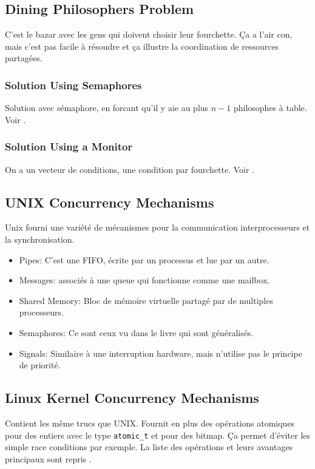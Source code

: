 \subsection{Dining Philosophers Problem}
C'est le bazar avec les gens qui doivent choisir leur fourchette.
Ça a l'air con, mais c'est pas facile à résoudre et ça illustre la coordination de ressources partagées.

\subsubsection{Solution Using Semaphores}
Solution avec sémaphore, en forcant qu'il y aie au plus $n-1$ philosophes à table.
Voir \cite[p.~281]{stallings}.

\subsubsection{Solution Using a Monitor}
On a un vecteur de conditions, une condition par fourchette.
Voir \cite[p.~282]{stallings}.

\subsection{UNIX Concurrency Mechanisms}
Unix fourni une variété de mécanismes pour la communication interprocesseurs et la synchronisation.
\begin{itemize}
  \item Pipes: C'est une FIFO, écrite par un processus et lue par un autre.
  \item Messages: associés à une queue qui fonctionne comme une mailbox.
  \item Shared Memory: Bloc de mémoire virtuelle partagé par de multiples processeurs.
  \item Semaphores: Ce sont ceux vu dans le livre qui sont généralisés.
  \item Signals: Similaire à une interruption hardware, mais n'utilise pas le principe de priorité.
\end{itemize}

\subsection{Linux Kernel Concurrency Mechanisms}
Contient les même trucs que UNIX.
Fournit en plus des opérations atomiques pour des entiers avec le type \lstinline|atomic_t|
et pour des bitmap.
Ça permet d'éviter les simple race conditions par exemple.
La liste des opérations et leurs avantages principaux sont repris \cite[p.~306-307]{stallings}.

